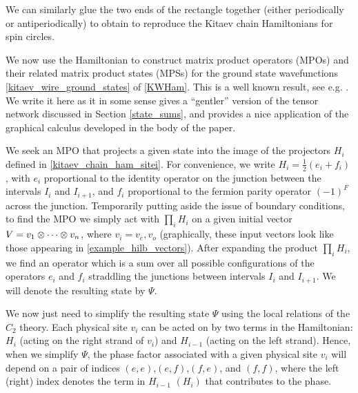 We can similarly glue the two ends of the rectangle together (either periodically or antiperiodically) to obtain
to reproduce the Kitaev chain Hamiltonians for spin circles.

\medskip

We now use the Hamiltonian to construct matrix product operators (MPOs) and their related matrix product states (MPSs) for the ground state wavefunctions \eqref{kitaev_wire_ground_states} of \eqref{KWHam}.
This is a well known result, see e.g. \cite{fidkowski2011,turzillo2016,bultinck2017b}.
We write it here as it in some sense gives a ``gentler'' version of the tensor network discussed in Section \ref{state_sums}, and provides a nice application of the graphical calculus developed in the body of the paper.

We seek an MPO that projects a given state into the image of the projectors $H_i$ defined in \eqref{kitaev_chain_ham_sitei}. 
For convenience, we write $H_i =\frac{1}{2}( e_{i} + f_{i})$, with $e_{i}$ proportional to the identity operator on the junction between the intervals $I_i$ and $I_{i+1}$, and $f_{i}$ proportional to the fermion parity operator $(-1)^F$ across the junction.
Temporarily putting aside the issue of boundary conditions, to find the MPO we simply act with $\prod_i H_i$ on 
a given initial vector $V = v_1\otimes \cdots \otimes v_n$, where $v_i=v_e,v_o$ (graphically, these input vectors look like those appearing in \eqref{example_hilb_vectors}).
After expanding the product $\prod_i H_i$, we find an operator which is a sum over all possible configurations of the operators $e_i$ and $f_i$ straddling the junctions between intervals $I_i$ and $I_{i+1}$. 
We will denote the resulting state by $\Psi$.

We now just need to simplify the resulting state $\Psi$ using the local relations of the $C_2$ theory. 
Each physical site $v_i$ can be acted on by two terms in the Hamiltonian: $H_i$ (acting on the right strand of $v_i$) and $H_{i-1}$ (acting on the left strand). 
Hence, when we simplify $\Psi$, the phase factor associated with a given physical site $v_i$ will depend on a pair of indices $(e,e)$,$(e,f)$,$(f,e)$, and $(f,f)$, where 
the left (right) index denotes the term in $H_{i-1}$ $(H_i)$ that contributes to the phase.

